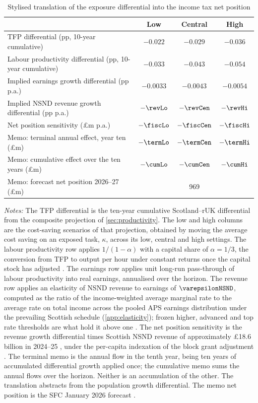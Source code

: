 \begin{table}[t]
\centering
\caption{Stylised translation of the exposure differential into the
income tax net position}
\label{tab:fiscal}
\small
\begin{tabular}{lccc}
\toprule
 & Low & Central & High \\
\midrule
TFP differential (pp, 10-year cumulative) &
  $-0.022$ & $-0.029$ & $-0.036$ \\
Labour productivity differential (pp, 10-year cumulative) &
  $-0.033$ & $-0.043$ & $-0.054$ \\
Implied earnings growth differential (pp p.a.) &
  $-0.0033$ & $-0.0043$ & $-0.0054$ \\
Implied NSND revenue growth differential (pp p.a.) &
  $-\revLo$ & $-\revCen$ & $-\revHi$ \\
Net position sensitivity (\pounds m p.a.) &
  $-\fiscLo$ & $-\fiscCen$ & $-\fiscHi$ \\
Memo: terminal annual effect, year ten (\pounds m) &
  $-\termLo$ & $-\termCen$ & $-\termHi$ \\
Memo: cumulative effect over the ten years (\pounds m) &
  $-\cumLo$ & $-\cumCen$ & $-\cumHi$ \\
Memo: forecast net position 2026--27 (\pounds m) &
  \multicolumn{3}{c}{969} \\
\bottomrule
\end{tabular}
\begin{minipage}{0.92\textwidth}
\vspace{0.4em}\footnotesize
\textit{Notes:} The TFP differential is the ten-year cumulative
Scotland--rUK differential from the composite projection of
\cref{sec:productivity}. The low and high columns are the cost-saving
scenarios of that projection, obtained by moving the average cost saving
on an exposed task, $\kappa$, across its low, central and high settings.
The labour productivity row applies $1/(1-\alpha)$ with a capital share
of $\alpha = 1/3$, the conversion from TFP to output per hour under
constant returns once the capital stock has adjusted \citep{obr2025}.
The earnings row applies unit long-run pass-through of labour
productivity into real earnings, annualised over the horizon. The
revenue row applies an elasticity of NSND revenue to earnings of
$\varepsilonNSND$, computed as the ratio of the income-weighted average
marginal rate to the average rate on total income across the pooled
APS earnings distribution under the prevailing Scottish schedule
(\cref{app:elasticity}); frozen higher, advanced and top rate
thresholds are what hold it above one \citep{sgreadyreckoner2026}.
The net position sensitivity is the revenue growth differential times
Scottish NSND revenue of approximately \pounds18.6 billion in 2024--25
\citep{hmrcoutturn2025}, under the per-capita indexation of the block
grant adjustment \citep{gov2023}. The terminal memo is the annual flow
in the tenth year, being ten years of accumulated differential growth
applied once; the cumulative memo sums the annual flows over the
horizon. Neither is an accumulation of the other. The translation
abstracts from the population growth differential. The memo net
position is the SFC January 2026 forecast \citep{sfc2026}.
\end{minipage}
\end{table}